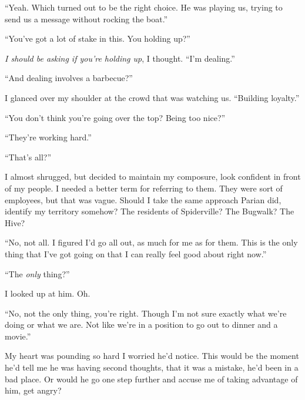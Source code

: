``Yeah.  Which turned out to be the right choice.  He was playing us, trying to send us a message without rocking the boat.''



``You've got a lot of stake in this.  You holding up?''



\emph{I should be asking if you're holding up}, I thought.  ``I'm dealing.''



``And dealing involves a barbecue?''



I glanced over my shoulder at the crowd that was watching us.  ``Building loyalty.''



``You don't think you're going over the top?  Being too nice?''



``They're working hard.''



``That's all?''



I almost shrugged, but decided to maintain my composure, look confident in front of my people.  I needed a better term for referring to them.  They were sort of employees, but that was vague.  Should I take the same approach Parian did, identify my territory somehow?  The residents of Spiderville?  The Bugwalk?  The Hive?



``No, not all.  I figured I'd go all out, as much for me as for them.  This is the only thing that I've got going on that I can really feel good about right now.''



``The \emph{only} thing?''



I looked up at him.  Oh.



``No, not the only thing, you're right.  Though I'm not sure exactly what we're doing or what we are.  Not like we're in a position to go out to dinner and a movie.''



My heart was pounding so hard I worried he'd notice.  This would be the moment he'd tell me he was having second thoughts, that it was a mistake, he'd been in a bad place.  Or would he go one step further and accuse me of taking advantage of him, get angry?



